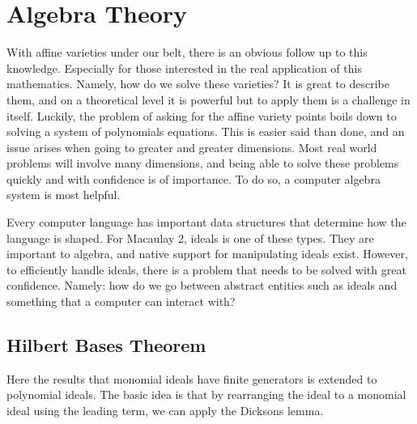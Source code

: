 \clearpage{\thispagestyle{empty}}
\section{Algebra Theory}
With affine varieties under our belt, there is an obvious follow up to this knowledge. Especially for those interested in the real application of this mathematics. Namely, how do we solve these varieties? It is great to describe them, and on a theoretical level it is powerful but to apply them is a challenge in itself. Luckily, the problem of asking for the affine variety points boils down to solving a system of polynomials equations. This is easier said than done, and an issue arises when going to greater and greater dimensions. Most real world problems will involve many dimensions, and being able to solve these problems quickly and with confidence is of importance. To do so, a computer algebra system is most helpful.

Every computer language has important data structures that determine how the language is shaped. For Macaulay 2, ideals is one of these types. They are important to algebra, and native support for manipulating ideals exist. However, to efficiently handle ideals, there is a problem that needs to be solved with great confidence. Namely: how do we go between abstract entities such as ideals and something that a computer can interact with?



\subsection{Hilbert Bases Theorem}
Here the results that monomial ideals have finite generators is extended to polynomial ideals. The basic idea is that by rearranging the ideal to a monomial ideal using the leading term, we can apply the Dicksons lemma. 


